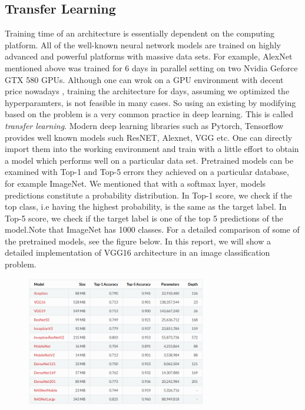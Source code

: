 \documentclass[12pt]{article}
\begin{document}
\subsection{Transfer Learning}
Training time of an architecture is essentially dependent on the computing platform. All of the well-known neural network models are trained on highly advanced and powerful platforms with massive data sets. For example, AlexNet mentioned above was trained for 6 days in parallel setting on two Nvidia Geforce GTX 580 GPUs. Although one can wrok on a GPU environment with decent price nowadays , training the architecture for days, assuming we optimized the hyperparamters, is not feasible in many cases. So using an existing  by modifying based on the problem is a very common practice in deep learning. This is called \textit{transfer learning}. Modern deep learning libraries such as Pytorch, Tensorflow provides well known models such ResNET, Alexnet, VGG etc. One can directly import them into the working environment and train with a little effort to obtain a model which performs well on a particular data set. Pretrained models can be examined with Top-1 and Top-5 errors they achieved on a particular database, for example ImageNet. We mentioned that with a softmax layer, models predictions constitute a probability distribution. In Top-1 score, we check if the top class, i.e having the highest probability, is the same as the target label. In Top-5 score, we check if the target label is one of the top 5 predictions of the model.Note that ImageNet has 1000 classes. For a detailed comparison of some of the pretrained models, see the figure below.  In this report, we will show a detailed implementation of VGG16 architecture in an image classification problem.  
\begin{figure}[H]
 \label{fig:overfit2}
  \centering
  \includegraphics[width=0.70\textwidth]{trancomp.png}
\end{figure}
\end{document}
